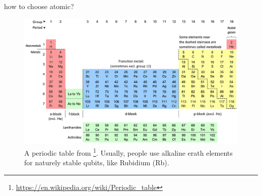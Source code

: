 \documentclass[18 pt]{beamer}
\begin{document}
\begin{frame}{how to choose atomic?}
  \begin{figure}
    \centering
    \includegraphics[width=.8\textwidth]{IMG/Colour_18-col_PT_with_labels}
    \caption{A periodic table from \footnote{\url{https://en.wikipedia.org/wiki/Periodic_table}}. Usually, people use alkaline erath elements for naturely stable qubits, like Rubidium (Rb).}
  \end{figure}
\end{frame}
\end{document}
